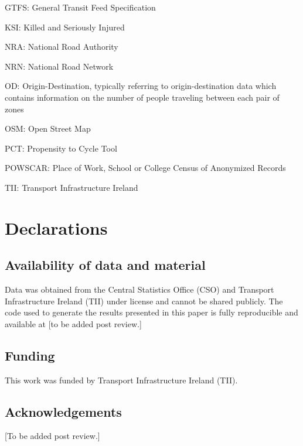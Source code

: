 \documentclass[
  super,
  preprint,
  3p]{elsarticle}
\begin{document}
GTFS: General Transit Feed Specification

KSI: Killed and Seriously Injured

NRA: National Road Authority

NRN: National Road Network

OD: Origin-Destination, typically referring to origin-destination data
which contains information on the number of people traveling between
each pair of zones

OSM: Open Street Map

PCT: Propensity to Cycle Tool

POWSCAR: Place of Work, School or College Census of Anonymized Records

TII: Transport Infrastructure Ireland

\hypertarget{declarations}{%
\section{Declarations}\label{declarations}}

\hypertarget{availability-of-data-and-material}{%
\subsection*{Availability of data and
material}\label{availability-of-data-and-material}}

Data was obtained from the Central Statistics Office (CSO) and Transport
Infrastructure Ireland (TII) under license and cannot be shared
publicly. The code used to generate the results presented in this paper
is fully reproducible and available at {[}to be added post review.{]}

\hypertarget{funding}{%
\subsection*{Funding}\label{funding}}

This work was funded by Transport Infrastructure Ireland (TII).

\hypertarget{acknowledgements}{%
\subsection*{Acknowledgements}\label{acknowledgements}}

{[}To be added post review.{]}


  
\end{document}
